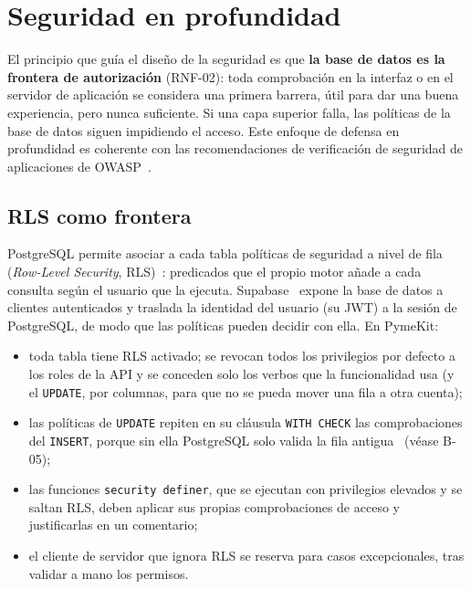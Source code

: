 \section{Seguridad en profundidad}
\label{sec:seguridad}

El principio que guía el diseño de la seguridad es que \textbf{la base de
datos es la frontera de autorización} (RNF-02): toda comprobación en la
interfaz o en el servidor de aplicación se considera una primera barrera, útil
para dar una buena experiencia, pero nunca suficiente. Si una capa superior
falla, las políticas de la base de datos siguen impidiendo el acceso. Este
enfoque de defensa en profundidad es coherente con las recomendaciones de
verificación de seguridad de aplicaciones de OWASP~\cite{owasp-asvs}.

\subsection{RLS como frontera}

PostgreSQL permite asociar a cada tabla políticas de seguridad a nivel de
fila (\textit{Row-Level Security}, RLS)~\cite{postgresql-rls}: predicados que
el propio motor añade a cada consulta según el usuario que la ejecuta.
Supabase~\cite{supabase-rls} expone la base de datos a clientes
autenticados y traslada la identidad del usuario (su JWT) a la sesión de
PostgreSQL, de modo que las políticas pueden decidir con ella. En PymeKit:

\begin{itemize}
  \item toda tabla tiene RLS activado; se revocan todos los privilegios por
        defecto a los roles de la API y se conceden solo los verbos que la
        funcionalidad usa (y el \texttt{UPDATE}, por columnas, para que no se
        pueda mover una fila a otra cuenta);
  \item las políticas de \texttt{UPDATE} repiten en su cláusula
        \texttt{WITH CHECK} las comprobaciones del \texttt{INSERT}, porque sin
        ella PostgreSQL solo valida la fila antigua~\cite{postgresql-createpolicy}
        (véase B-05);
  \item las funciones \texttt{security definer}, que se ejecutan con
        privilegios elevados y se saltan RLS, deben aplicar sus propias
        comprobaciones de acceso y justificarlas en un comentario;
  \item el cliente de servidor que ignora RLS se reserva para casos
        excepcionales, tras validar a mano los permisos.
\end{itemize}

